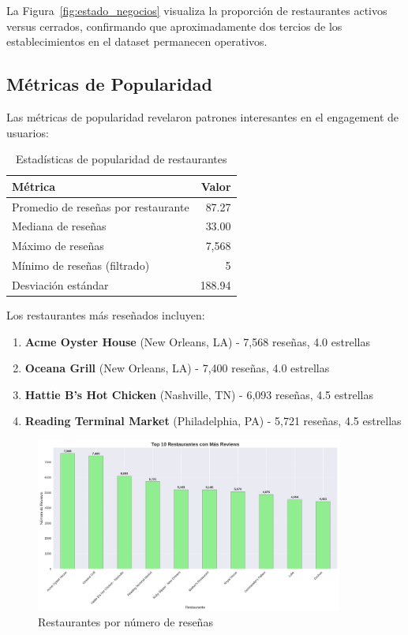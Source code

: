 \documentclass[12pt,a4paper,twoside,openany]{book}
\begin{document}
La Figura~\ref{fig:estado_negocios} visualiza la proporción de restaurantes activos versus cerrados, confirmando que aproximadamente dos tercios de los establecimientos en el dataset permanecen operativos.

\subsection{Métricas de Popularidad}

Las métricas de popularidad revelaron patrones interesantes en el engagement de usuarios:

\begin{table}[H]
\centering
\caption{Estadísticas de popularidad de restaurantes}
\begin{tabular}{@{}lr@{}}
\toprule
\textbf{Métrica} & \textbf{Valor} \\
\midrule
Promedio de reseñas por restaurante & 87.27 \\
Mediana de reseñas & 33.00 \\
Máximo de reseñas & 7,568 \\
Mínimo de reseñas (filtrado) & 5 \\
Desviación estándar & 188.94 \\
\bottomrule
\end{tabular}
\end{table}

Los restaurantes más reseñados incluyen:
\begin{enumerate}
    \item \textbf{Acme Oyster House} (New Orleans, LA) - 7,568 reseñas, 4.0 estrellas
    \item \textbf{Oceana Grill} (New Orleans, LA) - 7,400 reseñas, 4.0 estrellas
    \item \textbf{Hattie B's Hot Chicken} (Nashville, TN) - 6,093 reseñas, 4.5 estrellas
    \item \textbf{Reading Terminal Market} (Philadelphia, PA) - 5,721 reseñas, 4.5 estrellas
\end{enumerate}

\begin{figure}[H]
\centering
\includegraphics[width=0.9\textwidth]{figures/business_top_restaurants_by_reviews.png}
\caption{Restaurantes por número de reseñas}
\label{fig:business_top_restaurants}
\end{figure}
\end{document}
